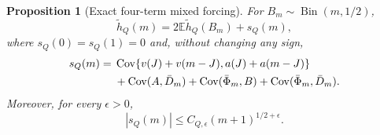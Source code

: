\documentclass[11pt]{article}
\numberwithin{equation}{section}
\newtheorem{proposition}[theorem]{Proposition}
\newcommand{\E}{\mathbb E}\newcommand{\Pp}{\mathbb P}
\newcommand{\1}{\mathbf 1}\newcommand{\F}{\mathcal F}\newcommand{\D}{\mathcal D}
\begin{document}
\begin{proposition}[Exact four-term mixed forcing]\label{prop:mixed-force-d}
For $B_m\sim\operatorname {Bin}(m,1/2)$,
\begin{equation}
 \widetilde h_Q(m)=2\E\widetilde h_Q(B_m)+s_Q(m),       \label{eq:mixed-renew-d}
\end{equation}
where $s_Q(0)=s_Q(1)=0$ and, without changing any sign,
\begin{align}
 s_Q(m)={}&\operatorname{Cov}\{v(J)+v(m-J),a(J)+a(m-J)\}             \label{eq:mixed-four-d}\\
 &+\operatorname{Cov}(A,\bar D_m)+\operatorname{Cov}(\bar\Phi_m,B)
   +\operatorname{Cov}(\bar\Phi_m,\bar D_m).\notag
\end{align}
Moreover, for every $\epsilon>0$,
\begin{equation}|s_Q(m)|\le C_{Q,\epsilon}(m+1)^{1/2+\epsilon}.\label{eq:mixed-force-bound-d}\end{equation}
\end{proposition}
\end{document}
